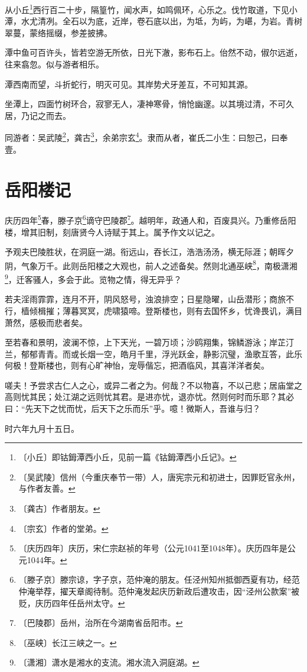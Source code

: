 \documentclass[12pt,UTF-8,openany]{ctexbook}
\begin{document}
\begin{normalsize}
    
    从小丘\footnote{〔小丘〕即钴鉧潭西小丘，见前一篇《钴鉧潭西小丘记》。}西行百二十步，隔篁竹，闻水声，如鸣佩环，心乐之。伐竹取道，下见小潭，水尤清冽。全石以为底，近岸，卷石底以出，为坻，为屿，为嵁，为岩。青树翠蔓，蒙络摇缀，参差披拂。
    
    潭中鱼可百许头，皆若空游无所依，日光下澈，影布石上。佁然不动，俶尔远逝，往来翕忽。似与游者相乐。
    
    潭西南而望，斗折蛇行，明灭可见。其岸势犬牙差互，不可知其源。
    
    坐潭上，四面竹树环合，寂寥无人，凄神寒骨，悄怆幽邃。以其境过清，不可久居，乃记之而去。
    
    同游者：吴武陵\footnote{〔吴武陵〕信州（今重庆奉节一带）人，唐宪宗元和初进士，因罪贬官永州，与作者友善。}，龚古\footnote{〔龚古〕作者朋友。}，余弟宗玄\footnote{〔宗玄〕作者的堂弟。}。隶而从者，崔氏二小生：曰恕己，曰奉壹。
\end{normalsize}



\chapter{岳阳楼记}

\begin{normalsize}
    
    庆历四年\footnote{〔庆历四年〕庆历，宋仁宗赵祯的年号（公元1041至1048年）。庆历四年是公元1044年。}春，滕子京\footnote{〔滕子京〕滕宗谅，字子京，范仲淹的朋友。任泾州知州抵御西夏有功，经范仲淹举荐，擢天章阁待制。范仲淹发起庆历新政后遭攻击，因“泾州公款案”被贬，庆历四年任岳州太守。}谪守巴陵郡\footnote{〔巴陵郡〕岳州，治所在今湖南省岳阳市。}。越明年，政通人和，百废具兴。乃重修岳阳楼，增其旧制，刻唐贤今人诗赋于其上。属予作文以记之。
    
    予观夫巴陵胜状，在洞庭一湖。衔远山，吞长江，浩浩汤汤，横无际涯；朝晖夕阴，气象万千。此则岳阳楼之大观也，前人之述备矣。然则北通巫峡\footnote{〔巫峡〕长江三峡之一。}，南极潇湘\footnote{〔潇湘〕潇水是湘水的支流。湘水流入洞庭湖。}，迁客骚人，多会于此。览物之情，得无异乎？
    
    若夫淫雨霏霏，连月不开，阴风怒号，浊浪排空；日星隐曜，山岳潜形；商旅不行，樯倾楫摧；薄暮冥冥，虎啸猿啼。登斯楼也，则有去国怀乡，忧谗畏讥，满目萧然，感极而悲者矣。
    
    至若春和景明，波澜不惊，上下天光，一碧万顷；沙鸥翔集，锦鳞游泳；岸芷汀兰，郁郁青青。而或长烟一空，皓月千里，浮光跃金，静影沉璧，渔歌互答，此乐何极！登斯楼也，则有心旷神怡，宠辱偕忘，把酒临风，其喜洋洋者矣。
    
    嗟夫！予尝求古仁人之心，或异二者之为。何哉？不以物喜，不以己悲；居庙堂之高则忧其民；处江湖之远则忧其君。是进亦忧，退亦忧。然则何时而乐耶？其必曰：“先天下之忧而忧，后天下之乐而乐”乎。噫！微斯人，吾谁与归？
    
    时六年九月十五日。
\end{normalsize}
\end{document}
